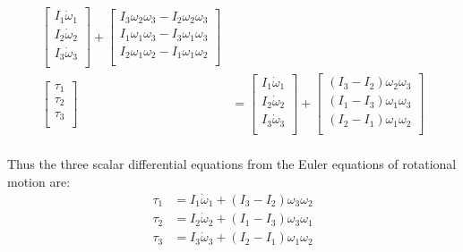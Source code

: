 \documentclass[titlepage]{article}
\begin{document}
\begin{equation}
\begin{split}
\begin{bmatrix}
			I_1\dot{\omega}_1 \\
			I_2\dot{\omega}_2 \\
			I_3\dot{\omega}_3 \\
		\end{bmatrix}+
		\begin{bmatrix}
			I_3\omega_2\omega_3 - I_2\omega_2\omega_3 \\
			I_1\omega_1\omega_3 - I_3\omega_1\omega_3 \\
			I_2\omega_1\omega_2 - I_1\omega_1\omega_2 \\
		\end{bmatrix} \\
		 \begin{bmatrix}
			\tau_1 \\
			\tau_2 \\
			\tau_3 \\
		\end{bmatrix}
		&=
		\begin{bmatrix}
			I_1\dot{\omega}_1 \\
			I_2\dot{\omega}_2 \\
			I_3\dot{\omega}_3 \\
		\end{bmatrix}+
		\begin{bmatrix}
			\left(I_3-I_2\right)\omega_2\omega_3 \\
			\left(I_1- I_3\right)\omega_1\omega_3 \\
			\left(I_2-I_1\right)\omega_1\omega_2 \\
		\end{bmatrix} \\
	\end{split} 
\end{equation}

\begin{mdframed}[linewidth=1pt, innertopmargin=10pt, innerbottommargin=10pt]
	Thus the three scalar differential equations from the Euler equations of rotational motion are:
	\begin{equation}
		\begin{split}
			\tau_1&=I_1\dot{\omega}_1+\left(I_3-I_2\right)\omega_3\omega_2\\
			\tau_2&=I_2\dot{\omega}_2+\left(I_1-I_3\right)\omega_3\omega_1\\
			\tau_3&=I_3\dot{\omega}_3+\left(I_2-I_1\right)\omega_1\omega_2 \\
		\end{split}
	\end{equation}
\end{mdframed}
\end{document}
